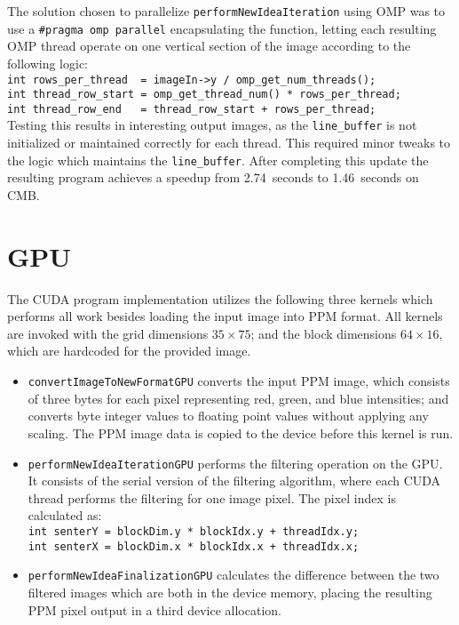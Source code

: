 The solution chosen to parallelize \texttt{performNewIdeaIteration} using \ac{OMP} was to use a \texttt{\#pragma omp parallel} encapsulating the function, letting each resulting \ac{OMP} thread operate on one vertical section of the image according to the following logic:\\

\texttt{int rows\_per\_thread~~= imageIn->y / omp\_get\_num\_threads();\\
int thread\_row\_start~= omp\_get\_thread\_num() * rows\_per\_thread;\\
int thread\_row\_end~~~= thread\_row\_start + rows\_per\_thread;
}\\

Testing this results in interesting output images, as the \texttt{line\_buffer} is not initialized or maintained correctly for each thread. This required minor tweaks to the logic which maintains the \texttt{line\_buffer}. After completing this update the resulting program achieves a speedup from 2.74~seconds to 1.46~seconds on \ac{CMB}.

\section*{\ac{GPU}}

The \ac{CUDA} program implementation utilizes the following three kernels which performs all work besides loading the input image into \ac{PPM} format. All kernels are invoked with the grid dimensions $35 \times 75$; and the block dimensions $64 \times 16$, which are hardcoded for the provided image.

\begin{itemize}
\item \texttt{convertImageToNewFormatGPU} converts the input \ac{PPM} image, which consists of three bytes for each pixel representing red, green, and blue intensities; and converts byte integer values to floating point values without applying any scaling. The \ac{PPM} image data is copied to the device before this kernel is run.
\item \texttt{performNewIdeaIterationGPU} performs the filtering operation on the \ac{GPU}. It consists of the serial version of the filtering algorithm, where each \ac{CUDA} thread performs the filtering for one image pixel. The pixel index is calculated as:\\[0.2cm]
\texttt{int senterY = blockDim.y * blockIdx.y + threadIdx.y;\\
int senterX = blockDim.x * blockIdx.x + threadIdx.x;}
\item \texttt{performNewIdeaFinalizationGPU} calculates the difference between the two filtered images which are both in the device memory, placing the resulting \ac{PPM} pixel output in a third device allocation.
\end{itemize}

